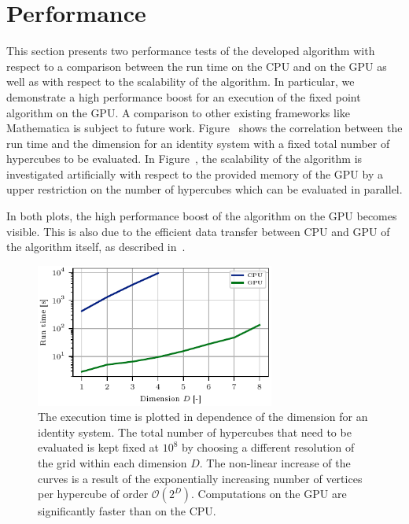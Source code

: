 \documentclass[paper=a4,11pt,bibliography=totoc]{scrartcl}
\begin{document}
\section{Performance}
\label{sec:performance}

This section presents two performance tests of the developed algorithm with respect to a comparison between the run time on the CPU and on the GPU as well as with respect to the scalability of the algorithm. In particular, we demonstrate a high performance boost for an execution of the fixed point algorithm on the GPU. A comparison to other existing frameworks like Mathematica is subject to future work. Figure~ shows the correlation between the run time and the dimension for an identity system with a fixed total number of hypercubes to be evaluated. In Figure~, the scalability of the algorithm is investigated artificially with respect to the provided memory of the GPU by a  upper restriction on the number of hypercubes which can be evaluated in parallel.

In both plots, the high performance boost of the algorithm on the GPU becomes visible. This is also due to the efficient data transfer between CPU and GPU of the algorithm itself, as described in~.

\begin{figure}
	\centering\includegraphics[width=0.7\textwidth]{performance_plot1}
	\caption{The execution time is plotted in dependence of the dimension for an identity system. The total number of hypercubes that need to be evaluated is kept fixed at $10^8$ by choosing a different resolution of the grid within each dimension $D$. The non-linear increase of the curves is a result of the exponentially increasing number of vertices per hypercube of order $\mathcal{O}(2^D)$. Computations on the GPU are significantly faster than on the CPU.}
	\label{fig:performance}
\end{figure}
\end{document}
